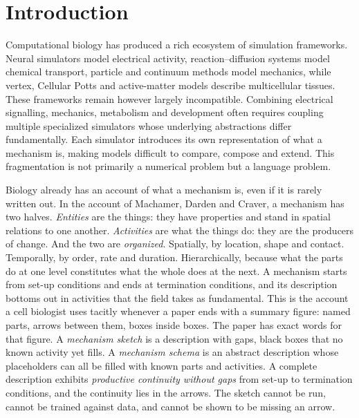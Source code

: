 \documentclass[11pt]{article}
\begin{document}
\section{Introduction}

Computational biology has produced a rich ecosystem of simulation frameworks.
Neural simulators model electrical activity, reaction--diffusion systems model
chemical transport, particle and continuum methods model mechanics, while
vertex, Cellular Potts and active-matter models describe multicellular tissues.
These frameworks remain however largely incompatible. Combining electrical
signalling, mechanics, metabolism and development often requires coupling multiple
specialized simulators whose underlying abstractions differ fundamentally. Each
simulator introduces its own representation of what a mechanism is, making models
difficult to compare, compose and extend. This fragmentation is not primarily a
numerical problem but a language problem.

Biology already has an account of what a mechanism is, even if it is rarely written
out. In the account of Machamer, Darden and Craver, a mechanism has two halves.
\emph{Entities} are the things: they have properties and stand in spatial relations to
one another. \emph{Activities} are what the things do: they are the producers of
change. And the two are \emph{organized}. Spatially, by location, shape and contact.
Temporally, by order, rate and duration. Hierarchically, because what the parts do at
one level constitutes what the whole does at the next. A mechanism starts from set-up
conditions and ends at termination conditions, and its description bottoms out in
activities that the field takes as fundamental. This is the account a cell biologist
uses tacitly whenever a paper ends with a summary figure: named parts, arrows between
them, boxes inside boxes. The paper has exact words for that figure. A \emph{mechanism
sketch} is a description with gaps, black boxes that no known activity yet fills. A
\emph{mechanism schema} is an abstract description whose placeholders can all be
filled with known parts and activities. A complete description exhibits
\emph{productive continuity without gaps} from set-up to termination conditions, and
the continuity lies in the arrows. The sketch cannot be run, cannot be trained against
data, and cannot be shown to be missing an arrow.
\end{document}
